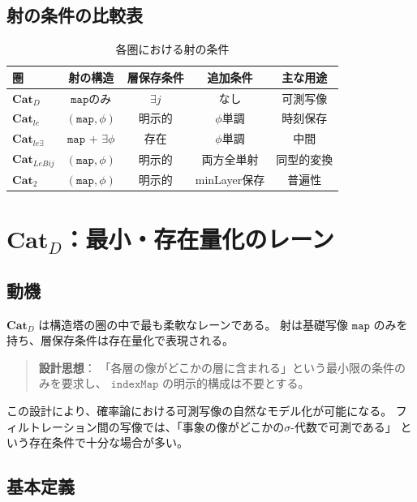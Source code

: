 \documentclass{ltjsarticle}
\theoremstyle{definition}
\newcommand{\catD}{\mathbf{Cat}_D}
\newcommand{\catle}{\mathbf{Cat}_{le}}
\newcommand{\catleexists}{\mathbf{Cat}_{le\exists}}
\newcommand{\catlebij}{\mathbf{Cat}_{LeBij}}
\newcommand{\cattwo}{\mathbf{Cat}_2}
\newcommand{\indexMap}{\mathtt{indexMap}}
\begin{document}
\subsection{射の条件の比較表}

\begin{table}[htbp]
\centering
\caption{各圏における射の条件}
\label{tab:morphism-conditions}
\begin{tabular}{lcccc}
\toprule
圏 & 射の構造 & 層保存条件 & 追加条件 & 主な用途 \\
\midrule
$\catD$ & $\mathtt{map}$のみ & $\exists j$ & なし & 可測写像 \\
$\catle$ & $(\mathtt{map}, \phi)$ & 明示的 & $\phi$単調 & 時刻保存 \\
$\catleexists$ & $\mathtt{map}$ + $\exists\phi$ & 存在 & $\phi$単調 & 中間 \\
$\catlebij$ & $(\mathtt{map}, \phi)$ & 明示的 & 両方全単射 & 同型的変換 \\
$\cattwo$ & $(\mathtt{map}, \phi)$ & 明示的 & minLayer保存 & 普遍性 \\
\bottomrule
\end{tabular}
\end{table}

\section{$\catD$：最小・存在量化のレーン}

\subsection{動機}

$\catD$ は構造塔の圏の中で最も柔軟なレーンである。
射は基礎写像 $\mathtt{map}$ のみを持ち、層保存条件は存在量化で表現される。

\begin{quote}
\textbf{設計思想}：
「各層の像がどこかの層に含まれる」という最小限の条件のみを要求し、
$\indexMap$ の明示的構成は不要とする。
\end{quote}

この設計により、確率論における可測写像の自然なモデル化が可能になる。
フィルトレーション間の写像では、「事象の像がどこかの$\sigma$-代数で可測である」
という存在条件で十分な場合が多い。

\subsection{基本定義}
\end{document}
